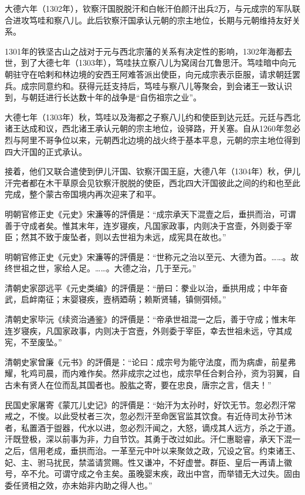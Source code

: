 大德六年（1302年），钦察汗国脱脱汗和白帐汗伯颜汗出兵2万，与元成宗的军队联合进攻笃哇和察八儿。此后钦察汗国承认元朝的宗主地位，长期与元朝维持友好关系。

1301年的铁坚古山之战对于元与西北宗藩的关系有决定性的影响，1302年海都去世，到了大德七年（1303年），笃哇扶立察八儿为窝阔台兀鲁思汗。笃哇暗中向元朝驻守在哈剌和林边境的安西王阿难答派出使臣，向元成宗表示臣服，请求朝廷罢兵。成宗同意约和。获得元廷支持后，笃哇与察八儿等聚会，到会诸王一致认识到，与朝廷进行长达数十年的战争是“自伤祖宗之业”。

大德七年（1303年）秋，笃哇以及海都之子察八儿约和使臣到达元廷。元廷与西北诸王达成和议，西北诸王承认元朝的宗主地位，设驿路，开关塞。自从1260年忽必烈与阿里不哥争位以来，元朝西北边境的战火终于基本平息，元朝的宗主地位得到四大汗国的正式承认。

接着，他们又联合遣使到伊儿汗国、钦察汗国王庭，大德八年（1304年）秋，伊儿汗完者都在木干草原会见钦察汗脱脱的使臣，西北四大汗国彼此之间的约和也至此完成，整个蒙古帝国境内再次迎来了和平。

明朝官修正史《元史》宋濂等的評價是：“成宗承天下混壹之后，垂拱而治，可谓善于守成者矣。惟其末年，连岁寝疾，凡国家政事，内则决于宫壸，外则委于宰臣；然其不致于废坠者，则以去世祖为未远，成宪具在故也。”

明朝官修正史《元史》宋濂等的評價是：“世称元之治以至元、大德为首。……。故终世祖之世，家给人足。……。大德之治，几于至元。”

清朝史家邵远平《元史类编》的評價是：“册曰：豢业以治，垂拱用成；中年奋武，启衅南征；末婴寝疾，壼柄廼萌；赖斯贤辅，镇侧弭倾。”

清朝史家毕沅《续资治通鉴》的評價是：“帝承世祖混一之后，善于守成；惟末年连岁寝疾，凡国家政事，内则决于宫壼，外则委于宰臣，幸去世祖未远，守其成宪，不至废坠。”

清朝史家曾廉《元书》的評價是：“论曰：成宗号为能守法度，而为病虐，前星弗耀，牝鸡司晨，而内难作矣。然非成宗之过也，成宗早任合剌合孙，资为羽翼，自古未有贤人在位而乱其国者也。股肱之寄，要在忠良，唐宗之言，信夫！”

民国史家屠寄《蒙兀儿史记》的評價是：“始汗为太孙时，好饮无节。忽必烈汗常戒之，不悛。以此受杖者三次，忽必烈汗至命医官监其饮食。有近侍司太孙节沐者，私置酒于盥器，代水以进，忽必烈汗闻之，大怒，谪戍其人远方，杀之于道。汗既登极，深以前事为非，力自节饮。其勇于改过如此。汗仁惠聪睿，承天下混一之后，信用老成，垂拱而治。一革至元中叶以来聚敛之政，冗设之官。约束诸王、妃、主、驸马扰民，禁滥请赏赐。性又谦冲，不好虚誉。群臣、皇后一再请上徽号，卒不允。可谓守成之令主矣。虽晚婴末疾，政出中宫，而举错无大过失。固由委任贤相之效，亦未始非内助之得人也。”


